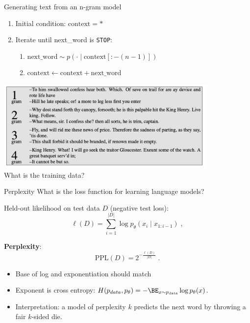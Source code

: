 \documentclass[usenames,dvipsnames,notes,11pt,aspectratio=169,hyperref={colorlinks=true, linkcolor=blue}]{beamer}
\newcommand{\pdfnote}[1]{}
\begin{document}
\begin{frame}
    {Generating text from an n-gram model}
    \begin{enumerate}
        \item Initial condition: $\text{context}=\ast$
        \item Iterate until next\_word is \texttt{STOP}:
            \begin{enumerate}
                \item $\text{next\_word} \sim p(\cdot \mid \text{context}[:-(n-1)])$
                \item $\text{context}  \leftarrow \text{context} + \text{next\_word}$
            \end{enumerate}
    \end{enumerate}

    \pause
    \includegraphics[height=4.5cm]{figures/ngram-sample}\\[1ex]
    What is the training data?

\end{frame}

\begin{frame}
    {Perplexity}
    What is the loss function for learning language models?
    \pause

    Held-out likelihood on test data $D$ (negative test loss):
    $$
    \ell({D}) = \sum_{i=1}^{|D|} \log p_\theta(x_i\mid x_{1:i-1}) \;,
    $$
    \vspace{-2em}
    \pdfnote{In practice, no sentence segmentation, a sequence of words, average likelihood of each word}
    \pause

    \textbf{Perplexity}:
    $$
 \text{PPL}(D) = 2^{-\frac{\ell(D)}{|D|}} \;.
 $$
    \vspace{-2em}
    \begin{itemize}
        \item Base of log and exponentiation should match
        \item Exponent is cross entropy: $H(p_{data}, p_\theta) = -\BE_{x\sim p_{\text{data}}}\log p_\theta(x)$.
            \pdfnote{Entropy is the number of bits needed to encode an event from a certain distribution.}
            \pdfnote{Cross-entropy is the number of bits needed to encode an event from a certain distribution (here p data) when your coding scheme is optimized for another distribution (here p theta).}
        \item Interpretation: a model of perplexity $k$ predicts the next word by throwing a fair $k$-sided die.
            \pdfnote{2 to the number of bits: total number of outcomes}
            \pdfnote{Sanity check: if PPL is larger than vocab size, something must be wrong.}
    \end{itemize}
\end{frame}
\end{document}
